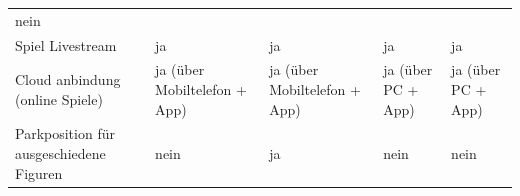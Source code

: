 \begin{longtable}[]{@{}lllll@{}}
\begin{minipage}[t]{0.13\columnwidth}
nein\strut
\end{minipage}\tabularnewline
\begin{minipage}[t]{0.18\columnwidth}\raggedright
Spiel Livestream\strut
\end{minipage} & \begin{minipage}[t]{0.18\columnwidth}\raggedright
ja\strut
\end{minipage} & \begin{minipage}[t]{0.22\columnwidth}\raggedright
ja\strut
\end{minipage} & \begin{minipage}[t]{0.15\columnwidth}\raggedright
ja\strut
\end{minipage} & \begin{minipage}[t]{0.13\columnwidth}\raggedright
ja\strut
\end{minipage}\tabularnewline
\begin{minipage}[t]{0.18\columnwidth}\raggedright
Cloud anbindung (online Spiele)\strut
\end{minipage} & \begin{minipage}[t]{0.18\columnwidth}\raggedright
ja (über Mobiltelefon + App)\strut
\end{minipage} & \begin{minipage}[t]{0.22\columnwidth}\raggedright
ja (über Mobiltelefon + App)\strut
\end{minipage} & \begin{minipage}[t]{0.15\columnwidth}\raggedright
ja (über PC + App)\strut
\end{minipage} & \begin{minipage}[t]{0.13\columnwidth}\raggedright
ja (über PC + App)\strut
\end{minipage}\tabularnewline
\begin{minipage}[t]{0.18\columnwidth}\raggedright
Parkposition für ausgeschiedene Figuren\strut
\end{minipage} & \begin{minipage}[t]{0.18\columnwidth}\raggedright
nein\strut
\end{minipage} & \begin{minipage}[t]{0.22\columnwidth}\raggedright
ja\strut
\end{minipage} & \begin{minipage}[t]{0.15\columnwidth}\raggedright
nein\strut
\end{minipage} & \begin{minipage}[t]{0.13\columnwidth}\raggedright
nein\strut
\end{minipage}\tabularnewline

\end{longtable}
